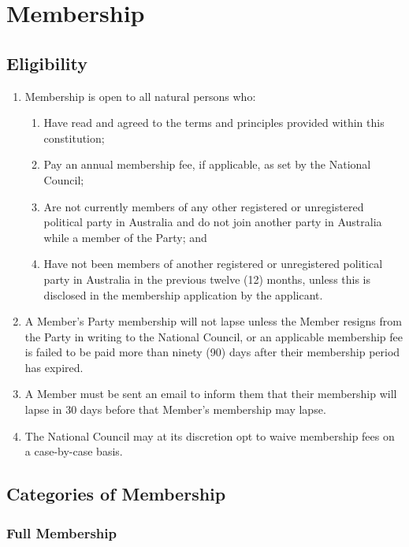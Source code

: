 \documentclass[a4paper,titlepage,8.5pt]{article}
\begin{document}
\section{Membership}

\subsection{Eligibility}

\begin{enumerate}
\item Membership is open to all natural persons who:
\begin{enumerate}
\item Have read and agreed to the terms and principles provided within this constitution;
\item Pay an annual membership fee, if applicable, as set by the National Council;
\item Are not currently members of any other registered or unregistered political party in Australia and do not join another party in Australia while a member of the Party; and
\item Have not been members of another registered or unregistered political party in Australia in the previous twelve (12) months, unless this is disclosed in the membership application by the applicant.
\end{enumerate}
\item A Member's Party membership will not lapse unless the Member resigns from the Party in writing to the National Council, or an applicable membership fee is failed to be paid more than ninety (90) days after their membership period has expired.
\item A Member must be sent an email to inform them that their membership will lapse in 30 days before that Member's membership may lapse.
\item The National Council may at its discretion opt to waive membership fees on a case-by-case basis.
\end{enumerate}

\subsection{Categories of Membership}

\subsubsection{Full Membership}
\end{document}
